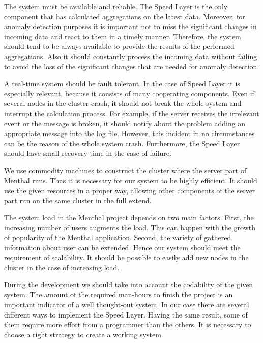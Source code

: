 The system must be available and reliable.
The Speed Layer is the only component that has calculated aggregations on the latest data.
Moreover, for anomaly detection purposes it is important not to miss the significant changes in incoming data and react to them in a timely manner.
Therefore, the system should tend to be always available to provide the results of the performed aggregations.
Also it should constantly process the incoming data without failing to avoid the loss of the significant changes that are needed for anomaly detection. 

A real-time system should be fault tolerant.
In the case of Speed Layer it is especially relevant, because it consists of many cooperating components.
Even if several nodes in the cluster crash, it should not break the whole system and interrupt the calculation process.
For example, if the server receives the irrelevant event or the message is broken, it should notify about the problem adding an appropriate message into the log file.
However, this incident in no circumstances can be the reason of the whole system crash.
Furthermore, the Speed Layer should have small recovery time in the case of failure. 

We use commodity machines to construct the cluster where the server part of Menthal runs.
Thus it is necessary for our system to be highly efficient.
It should use the given resources in a proper way, allowing other components of the server part run on the same cluster in the full extend.

The system load in the Menthal project depends on two main factors.
First, the increasing number of users augments the load.
This can happen with the growth of popularity of the Menthal application.
Second, the variety of gathered information about user can be extended.
Hence our system should meet the requirement of scalability.
It should be possible to easily add new nodes in the cluster in the case of increasing load.  

During the development we should take into account the codability of the given system.
The amount of the required man-hours to finish the project is an important indicator of a well thought-out system.
In our case there are several different ways to implement the Speed Layer.
Having the same result, some of them require more effort from a programmer than the others.
It is necessary to choose a right strategy to create a working system.


